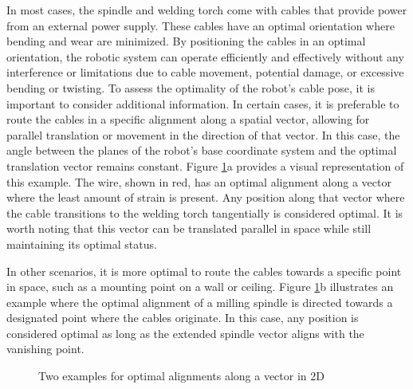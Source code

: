 In most cases, the spindle and welding torch come with cables that provide power from an external power supply. These cables have an optimal orientation where bending and wear are minimized. By positioning the cables in an optimal orientation, the robotic system can operate efficiently and effectively without any interference or limitations due to cable movement, potential damage, or excessive bending or twisting. To assess the optimality of the robot's cable pose, it is important to consider additional information. In certain cases, it is preferable to route the cables in a specific alignment along a spatial vector, allowing for parallel translation or movement in the direction of that vector. In this case, the angle between the planes of the robot's base coordinate system and the optimal translation vector remains constant. Figure \ref{OOPti}a provides a visual representation of this example. The wire, shown in red, has an optimal alignment along a vector where the least amount of strain is present. Any position along that vector where the cable transitions to the welding torch tangentially is considered optimal. It is worth noting that this vector can be translated parallel in space while still maintaining its optimal status.

In other scenarios, it is more optimal to route the cables towards a specific point in space, such as a mounting point on a wall or ceiling. Figure \ref{OOPti}b illustrates an example where the optimal alignment of a milling spindle is directed towards a designated point where the cables originate. In this case, any position is considered optimal as long as the extended spindle vector aligns with the vanishing point.


\begin{figure}[H]%
	\centering
	\qquad
	\caption{Two examples for optimal alignments along a vector in 2D}%
	\label{OOPti}%
\end{figure}



